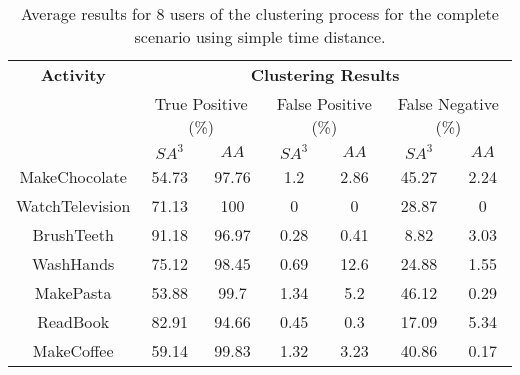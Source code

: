 \begin{table}[htbp]\scriptsize
  \begin{center}
        \begin{tabular}{ccccccc}
            \hline            
            \textbf{Activity} & \multicolumn{6}{c}{\textbf{Clustering Results}} \\
             & \multicolumn{2}{c}{True Positive (\%)} & \multicolumn{2}{c}{False Positive (\%)} & \multicolumn{2}{c}{False Negative (\%)} \\
             & $SA^3$ & $AA$ & $SA^3$ & $AA$ & $SA^3$ & $AA$ \\
            \hline
            MakeChocolate   & 54.73 & 97.76 & 1.2  & 2.86 & 45.27 & 2.24 \\
	    WatchTelevision & 71.13 & 100   & 0    & 0    & 28.87 & 0    \\
	    BrushTeeth      & 91.18 & 96.97 & 0.28 & 0.41 & 8.82  & 3.03 \\
	    WashHands       & 75.12 & 98.45 & 0.69 & 12.6 & 24.88 & 1.55 \\
	    MakePasta       & 53.88 & 99.7  & 1.34 & 5.2  & 46.12 & 0.29 \\
	    ReadBook        & 82.91 & 94.66 & 0.45 & 0.3  & 17.09 & 5.34 \\
	    MakeCoffee      & 59.14 & 99.83 & 1.32 & 3.23 & 40.86 & 0.17 \\
            \hline
        \end{tabular}
        \caption{Average results for 8 users of the clustering process for the complete scenario using simple time distance.}
        \label{tab-r-comp-t1}
        \end{center}
\end{table}



